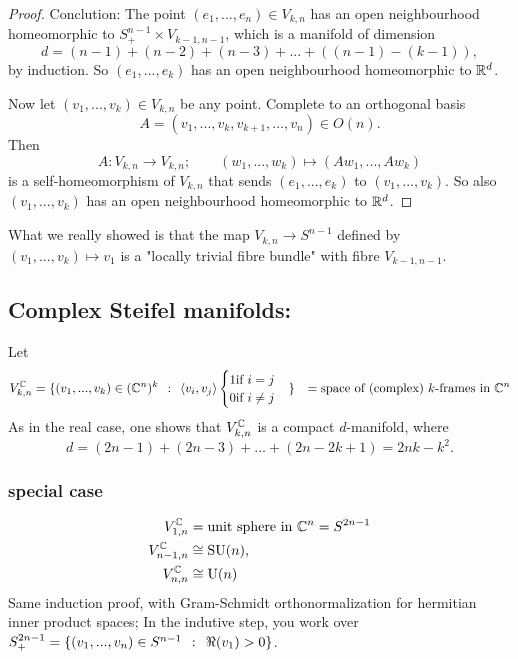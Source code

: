 \documentclass[a4paper,11pt,english]{article}
\newcommand{\textif}{\text{if }}
\begin{document}
\begin{proof}
Conclution:
The point $(e_1,...,e_n) \in V_{k,n}$ has an open neighbourhood homeomorphic to
$S_+^{n-1} \times V_{k-1,n-1}$, which is a manifold of dimension
\[ d = (n-1) + (n-2) + (n-3) + ... + ( (n-1) - (k-1)), \]
by induction. 
So $(e_1,...,e_k)$ has an open neighbourhood homeomorphic to $\mathbb{R}^d$.

Now let $(v_1, ...,v_k) \in V_{k,n}$ be any point. Complete to an orthogonal
basis
\[ A = (v_1, ..., v_k, v_{k+1}, ..., v_n) \in O(n). \]
Then
\[ A : V_{k,n} \to V_{k,n}; \qquad (w_1, ..., w_k) \mapsto (Aw_1, ..., Aw_k) \]
is a self-homeomorphism of $V_{k,n}$ that sends $(e_1,...,e_k)$ to
$(v_1,...,v_k)$. So also  $(v_1,...,v_k)$ has an open neighbourhood homeomorphic
to $\mathbb{R}^d$.
\end{proof}

\begin{remark}
What we really showed is that the map $V_{k,n} \to S^{n-1}$ defined by
$(v_1,...,v_k) \mapsto v_1$ is a "locally trivial fibre bundle" with fibre
$V_{k-1, n-1}$. 
\end{remark}

\subsection{Complex Steifel manifolds:}

Let 
\begin{align*}
V^\C_{k,n} &= \{ (v_1,...,v_k) \in (\C^n)^k \q: \<{v_i, v_j} 
\begin{cases} 1 \textif i = j \\ 0 \textif i \ne j \end{cases} \}
&= \text{space of (complex) } k\text{-frames in } \C^n
\end{align*}
As in the real case, one shows that $V^{\mathbb{C}}_{k,n}$ is a compact $d$-manifold,
where
\[ d = (2n -1) + (2n-3) + ... + (2n - 2k + 1) = 2nk - k^2. \]

\subsubsection{special case}

\begin{align*}
V^{\mathbb{C}}_{1,n} &= \text{unit sphere in } \mathbb{C}^n = S^{2n-1} \\
V^{\mathbb{C}}_{n-1,n} &\cong \operatorname{SU}(n), \\
V^{\mathbb{C}}_{n,n} &\cong \operatorname{U}(n)
\end{align*}
Same induction proof, with Gram-Schmidt orthonormalization for hermitian inner
product spaces; In the indutive step, you work over $S_+^{2n-1} = \{ (v_1, ...,
v_n) \in S^{n-1} \:\::\:\: \Re(v_1) > 0 \}$.
\end{document}
